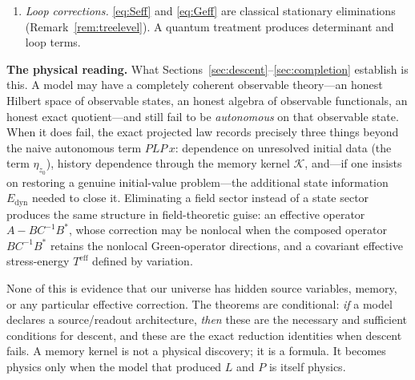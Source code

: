 \documentclass[11pt,reqno]{amsart}
\numberwithin{equation}{section}
\theoremstyle{plain}
\theoremstyle{definition}
\theoremstyle{remark}
\newcommand{\Edyn}{E_{\mathrm{dyn}}}
\newcommand{\Kmem}{\mathcal{K}}
\begin{document}
\begin{enumerate}
over the memory timescale, and then an explicit error estimate or a limiting argument
($\alpha\to\infty$ at fixed $\int\Kmem$, say) carried out in the concrete model at hand. We
supply none of this here, and it should not be assumed to be automatic. Note also that a large
norm
$\lVert QLQ\rVert$ implies nothing of the sort by itself---the norm bounds
$\lVert e^{\tau QLQ}\rVert\le e^{\tau\lVert QLQ\rVert}$ from above only, and a large-norm
generator may have purely oscillatory or even growing propagator. What matters is the location
of the spectrum (or, in infinite dimensions, the growth bound of the semigroup), not the size
of the generator. We have made no such hypothesis, and Theorem~\ref{thm:closure} shows that
without $PLQ=0$ such a truncation is never exact.
\item \emph{Loop corrections.} \eqref{eq:Seff} and \eqref{eq:Geff} are classical stationary
eliminations (Remark~\ref{rem:treelevel}). A quantum treatment produces determinant and loop
terms.
\end{enumerate}

\smallskip
\noindent\textbf{The physical reading.} What Sections~\ref{sec:descent}--\ref{sec:completion}
establish is this. A model may have a completely coherent observable theory---an honest Hilbert
space of observable states, an honest algebra of observable functionals, an honest exact
quotient---and still fail to be \emph{autonomous} on that observable state. When it does fail,
the exact projected law records precisely three things beyond the naive autonomous term
$PLP\,x$: dependence on unresolved initial data (the term $\eta_{z_{0}}$), history dependence
through the memory kernel $\Kmem$, and---if one insists on restoring a genuine initial-value
problem---the additional state information $\Edyn$ needed to close it. Eliminating a field
sector instead of a state sector produces the same structure in field-theoretic guise: an
effective operator $A-BC^{-1}B^{*}$, whose correction may be nonlocal when the composed operator
$BC^{-1}B^{*}$ retains the nonlocal Green-operator directions, and a covariant
effective stress-energy $T^{\mathrm{eff}}$ defined by variation.

None of this is evidence that our universe has hidden source variables, memory, or any
particular effective correction. The theorems are conditional: \emph{if} a model declares a
source/readout architecture, \emph{then} these are the necessary and sufficient conditions for
descent, and these are the exact reduction identities when descent fails. A memory kernel is
not a physical discovery; it is a formula. It becomes physics only when the model that produced
$L$ and $P$ is itself physics.
\end{document}
